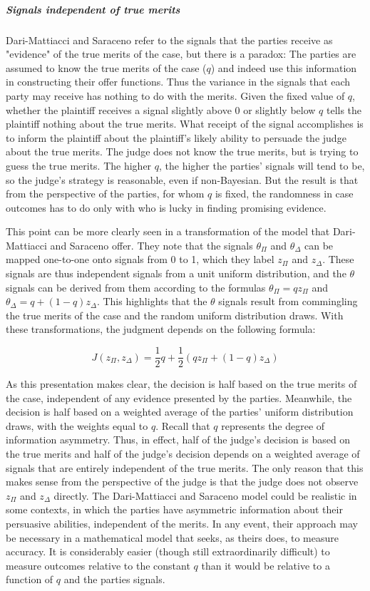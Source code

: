 \documentclass{article}
\begin{document}
\subparagraph{Signals independent of true merits}Dari-Mattiacci and Saraceno refer to the signals that the parties receive as "evidence" of the true merits of the case, but there is a paradox: The parties are assumed to know the true merits of the case ($q$) and indeed use this information in constructing their offer functions. Thus the variance in the signals that each party may receive has nothing to do with the merits. Given the fixed value of $q$, whether the plaintiff receives a signal slightly above 0 or slightly below $q$ tells the plaintiff nothing about the true merits. What receipt of the signal accomplishes is to inform the plaintiff about the plaintiff's likely ability to persuade the judge about the true merits. The judge does not know the true merits, but is trying to guess the true merits. The higher $q$, the higher the parties' signals will tend to be, so the judge's strategy is reasonable, even if non-Bayesian. But the result is that from the perspective of the parties, for whom $q$ is fixed, the randomness in case outcomes has to do only with who is lucky in finding promising evidence.

This point can be more clearly seen in a transformation of the model that Dari-Mattiacci and Saraceno offer. They note that the signals $\theta_\Pi$ and $\theta_\Delta$ can be mapped one-to-one onto signals from 0 to 1, which they label $z_\Pi$ and $z_\Delta$. These signals are thus independent signals from a unit uniform distribution, and the $\theta$ signals can be derived from them according to the formulas $\theta_\Pi = qz_\Pi$ and $\theta_\Delta=q+(1-q)z_\Delta$. This highlights that the $\theta$ signals result from commingling the true merits of the case and the random uniform distribution draws. With these transformations, the judgment depends on the following formula:

\begin{equation}\label{equation:original}
J(z_\Pi, z_\Delta) = \frac{1}{2}q + \frac{1}{2} (qz_\Pi+(1-q)z_\Delta)
\end{equation}

As this presentation makes clear, the decision is half based on the true merits of the case, independent of any evidence presented by the parties. Meanwhile, the decision is half based on a weighted average of the parties' uniform distribution draws, with the weights equal to $q$. Recall that $q$ represents the degree of information asymmetry. Thus, in effect, half of the judge's decision is based on the true merits and half of the judge's decision depends on a weighted average of signals that are entirely independent of the true merits. The only reason that this makes sense from the perspective of the judge is that the judge does not observe $z_\Pi$ and $z_\Delta$ directly. The Dari-Mattiacci and Saraceno model could be realistic in some contexts, in which the parties have asymmetric information about their persuasive abilities, independent of the merits. In any event, their approach may be necessary in a mathematical model that seeks, as theirs does, to measure accuracy. It is considerably easier (though still extraordinarily difficult) to measure outcomes relative to the constant $q$ than it would be relative to a function of $q$ and the parties signals. 
\end{document}
